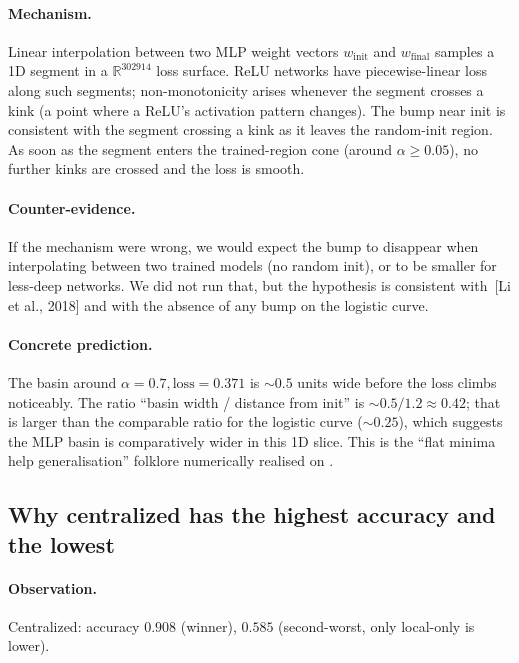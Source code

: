 \paragraph{Mechanism.} Linear interpolation between two MLP weight vectors
$w_{\text{init}}$ and $w_{\text{final}}$ samples a 1D segment in a $\mathbb{R}^{302914}$
loss surface. ReLU networks have piecewise-linear loss along such segments;
non-monotonicity arises whenever the segment crosses a kink (a point where a
ReLU's activation pattern changes). The bump near init is consistent with
the segment crossing a kink as it leaves the random-init region. As soon as
the segment enters the trained-region cone (around $\alpha \!\geq\! 0.05$),
no further kinks are crossed and the loss is smooth.

\paragraph{Counter-evidence.} If the mechanism were wrong, we would expect the
bump to disappear when interpolating between two trained models (no random
init), or to be smaller for less-deep networks. We did not run that, but the
hypothesis is consistent with~[Li et al., 2018] and with the absence
of any bump on the logistic curve.

\paragraph{Concrete prediction.} The basin around $\alpha\!=\!0.7, \mathrm{loss}\!=\!0.371$
is $\sim$$0.5$ units wide before the loss climbs noticeably. The ratio
``basin width / distance from init'' is $\sim$$0.5/1.2 \approx 0.42$; that is
larger than the comparable ratio for the logistic curve ($\sim$$0.25$), which
suggests the MLP basin is comparatively wider in this 1D slice. This is the
``flat minima help generalisation'' folklore numerically realised on
\mimic{}.

\subsection{Why centralized has the highest accuracy and the lowest \auprc{}}
\label{sec:mechanism-centralized}

\paragraph{Observation.} Centralized: accuracy $0.908$ (winner),
\auprc{} $0.585$ (second-worst, only local-only is lower).

